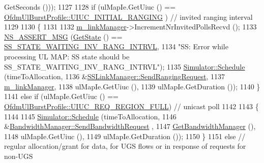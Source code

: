 \begin{DoxyCode}
      GetSeconds ()));
1127 
1128           \textcolor{keywordflow}{if} (ulMapIe.GetUiuc () == \hyperlink{classns3_1_1OfdmUlBurstProfile_ae528783c4b3c6700ff49dfd7a555cb3daaea7b6256d4bcd0125f0248c0560c94e}{OfdmUlBurstProfile::UIUC\_INITIAL\_RANGING}
      ) \textcolor{comment}{// invited ranging interval}
1129 
1130             \{
1131 
1132               \hyperlink{classns3_1_1SubscriberStationNetDevice_a24e7df59fb312c196318f0366b63c6e6}{m\_linkManager}->IncrementNrInvitedPollsRecvd ();
1133               \hyperlink{assert_8h_aff5ece9066c74e681e74999856f08539}{NS\_ASSERT\_MSG} (\hyperlink{classns3_1_1WimaxNetDevice_a4b7a2a630af23ac97b1012d5e5facc9f}{GetState} () == 
      \hyperlink{classns3_1_1SubscriberStationNetDevice_af9f145bc05df1f18610a3d4b61ff9ee4aba899a8d6171ee1a9a924dde6c62f16f}{SS\_STATE\_WAITING\_INV\_RANG\_INTRVL},
1134                              \textcolor{stringliteral}{"SS: Error while processing UL MAP: SS state should be
       SS\_STATE\_WAITING\_INV\_RANG\_INTRVL"});
1135               \hyperlink{classns3_1_1Simulator_a671882c894a08af4a5e91181bf1eec13}{Simulator::Schedule} (timeToAllocation,
1136                                    &\hyperlink{classns3_1_1SSLinkManager_a588462b7fadd024760b556fc5e951d2c}{SSLinkManager::SendRangingRequest},
1137                                    \hyperlink{classns3_1_1SubscriberStationNetDevice_a24e7df59fb312c196318f0366b63c6e6}{m\_linkManager},
1138                                    ulMapIe.GetUiuc (),
1139                                    ulMapIe.GetDuration ());
1140             \}
1141           \textcolor{keywordflow}{else} \textcolor{keywordflow}{if} (ulMapIe.GetUiuc () == 
      \hyperlink{classns3_1_1OfdmUlBurstProfile_ae528783c4b3c6700ff49dfd7a555cb3daae074d10caa7fe18da973227c7f9942f}{OfdmUlBurstProfile::UIUC\_REQ\_REGION\_FULL}) \textcolor{comment}{// unicast poll}
1142 
1143             \{
1144 
1145               \hyperlink{classns3_1_1Simulator_a671882c894a08af4a5e91181bf1eec13}{Simulator::Schedule} (timeToAllocation,
1146                                    &\hyperlink{classns3_1_1BandwidthManager_acbe780c5080f4001b2a1a117f446dd74}{BandwidthManager::SendBandwidthRequest}
      ,
1147                                    \hyperlink{classns3_1_1WimaxNetDevice_ae5b92eaa51e409609c2ac362894af454}{GetBandwidthManager} (),
1148                                    ulMapIe.GetUiuc (),
1149                                    ulMapIe.GetDuration ());
1150             \}
1151           \textcolor{keywordflow}{else} \textcolor{comment}{// regular allocation/grant for data, for UGS flows or in response of requests for non-UGS
}
\end{DoxyCode}

